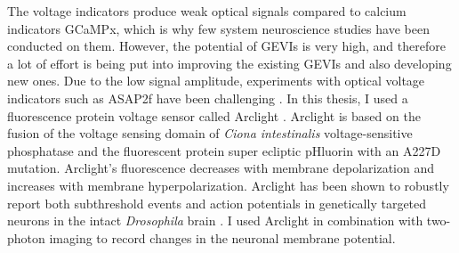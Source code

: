 The voltage indicators produce weak optical signals compared to calcium indicators GCaMPx, which is why few system neuroscience studies have been conducted on them. However, the potential of GEVIs is very high, and therefore a lot of effort is being put into improving the existing GEVIs and also developing new ones. Due to the low signal amplitude, experiments with optical voltage indicators such as ASAP2f have been challenging \parencite{Yang2016}. In this thesis, I used a fluorescence protein voltage sensor called Arclight \parencite{Jin2012}. Arclight is based on the fusion of the voltage sensing domain of \textit{Ciona intestinalis} voltage-sensitive phosphatase \parencite{Murata2005} and the fluorescent protein super ecliptic pHluorin with an A227D mutation. Arclight's fluorescence decreases with membrane depolarization and increases with membrane hyperpolarization. Arclight has been shown to robustly report both subthreshold events and action potentials in genetically targeted neurons in the intact \textit{Drosophila} brain \parencite{Cao2013}. I used Arclight in combination with two-photon imaging to record changes in the neuronal membrane potential.



